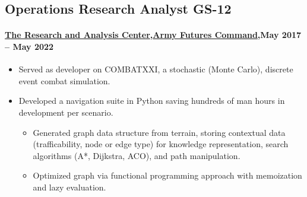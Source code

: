 \subsection{Operations Research Analyst GS-12}
\paragraph{\href{https://www.wsmr.army.mil/tc/team/trac.html}{The Research and Analysis Center},\href{https://www.army.mil/futures}{Army Futures Command},May 2017 -- May 2022}
\begin{itemize}
    \item Served as developer on COMBATXXI, a stochastic (Monte Carlo), discrete event combat simulation.
    \item Developed a navigation suite in Python saving hundreds of man hours in development per scenario.
    \begin{itemize}
        \item Generated graph data structure from terrain, storing contextual data (trafficability, node or edge type) for knowledge representation, search algorithms (A*, Dijkstra, ACO), and path manipulation.
        \item Optimized graph via functional programming approach with memoization and lazy evaluation.
    \end{itemize}

\end{itemize}
